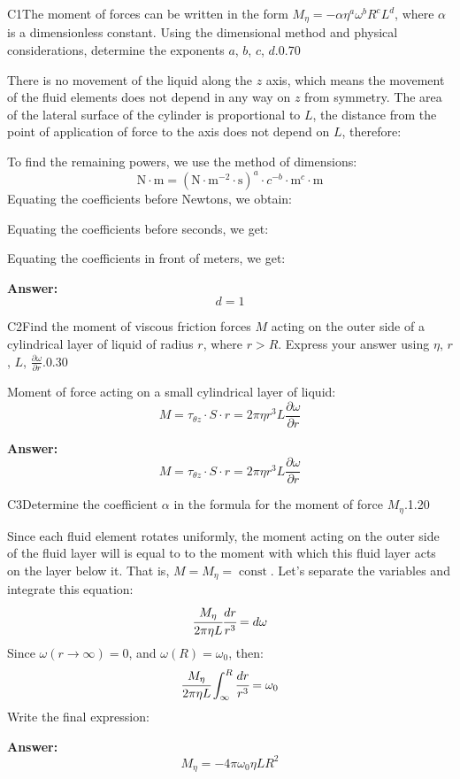\documentclass[11pt,a4paper]{article}
\begin{document}
\begin{solcard}{C1}{The moment of forces can be written in the form $M_\eta = -\alpha \eta^a \omega^b R^c L^d$, where $\alpha$ is a dimensionless constant. Using the dimensional method and physical considerations, determine the exponents $a$, $b$, $c$, $d$.}{0.70}

There is no movement of the liquid along the $z$ axis, which means the movement of the fluid elements does not depend in any way on $z$ from symmetry. The area of the lateral surface of the cylinder is proportional to $L$, the distance from the point of application of force to the axis does not depend on $L$, therefore:


To find the remaining powers, we use the method of dimensions: \[\text{N}\cdot \mathrm{m}=(\text{N}\cdot \mathrm{m}^{-2}\cdot \mathrm{s})^a\cdot c^{-b}\cdot \mathrm{m}^{c}\cdot \mathrm{m}\]Equating the coefficients before Newtons, we obtain:


Equating the coefficients before seconds, we get:


Equating the coefficients in front of meters, we get:

\par\smallskip\noindent\textbf{Answer:} \[d=1\]
\end{solcard}

\begin{solcard}{C2}{Find the moment of viscous friction forces $M$ acting on the outer side of a cylindrical layer of liquid of radius $r$, where $r> R$. Express your answer using $\eta$, $r$, $L$, $\frac{\partial \omega}{\partial r}$.}{0.30}

Moment of force acting on a small cylindrical layer of liquid: \[M =\tau_{\theta z}\cdot S\cdot r= 2\pi \eta r^3L \frac{\partial \omega}{\partial r}\]

\par\smallskip\noindent\textbf{Answer:} \[M =\tau_{\theta z}\cdot S\cdot r= 2\pi \eta r^3L \frac{\partial \omega}{\partial r}\]
\end{solcard}

\begin{solcard}{C3}{Determine the coefficient $\alpha$ in the formula for the moment of force $M_{\eta}$.}{1.20}

Since each fluid element rotates uniformly, the moment acting on the outer side of the fluid layer will is equal to to the moment with which this fluid layer acts on the layer below it. That is, $M = M_\eta = \operatorname{const}$. Let's separate the variables and integrate this equation: \[\cfrac{M_\eta}{2\pi \eta L} \cfrac{dr}{r^3}=  d\omega\]Since $\omega(r\to\infty)=0$, and $\omega(R) = \omega_0$, then: \[\cfrac{M_\eta}{2\pi \eta L} \int^{R}_{\infty}\cfrac{dr}{r^3}=  \omega_0\]Write the final expression:

\par\smallskip\noindent\textbf{Answer:} \[M_{\eta}=-4\pi\omega_0\eta LR^2\]
\end{solcard}
\end{document}
